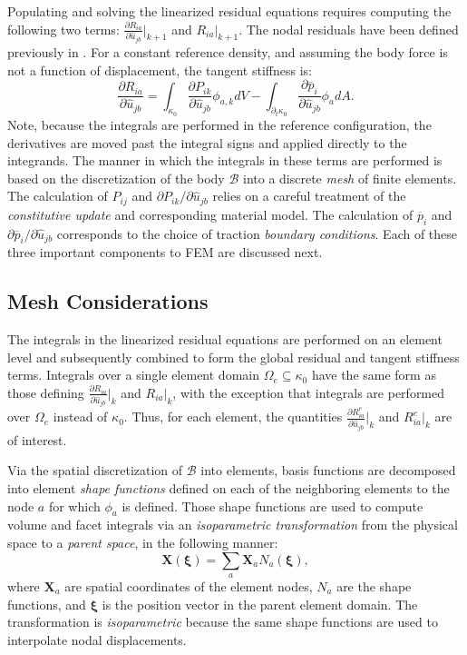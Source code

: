 Populating and solving the linearized residual equations requires computing the following two terms: $\frac{\partial R_{ia}}{\partial \hat{u}_{jb}} \big|_{k+1}$ and $R_{ia}\big|_{k+1}$. The nodal residuals have been defined previously in . For a constant reference density, and assuming the body force is not a function of displacement, the tangent stiffness is:
\begin{equation}
\frac{\partial R_{ia}}{\partial \hat{u}_{jb}} = \int_{\kappa_0}\frac{\partial P_{ik}}{\partial \hat{u}_{jb}}\phi_{a,k}dV - \int_{\partial_t\kappa_0}\frac{\partial \overline{p}_i}{\partial \hat{u}_{jb}}\phi_adA.
\end{equation}
Note, because the integrals are performed in the reference configuration, the derivatives are moved past the integral signs and applied directly to the integrands. The manner in which the integrals in these terms are performed is based on the discretization of the body $\mathcal{B}$ into a discrete \textit{mesh} of finite elements. The calculation of $P_{ij}$ and $\partial{P}_{ik}/\partial{\hat{u}_{jb}}$ relies on a careful treatment of the \textit{constitutive update} and corresponding material model. The calculation of $\overline{p}_i$ and $\partial{\overline{p}_i}/\partial{\hat{u}_{jb}}$ corresponds to the choice of traction \textit{boundary conditions}. Each of these three important components to FEM are discussed next.

\subsection{Mesh Considerations}

The integrals in the linearized residual equations are performed on an element level and subsequently combined to form the global residual and tangent stiffness terms. Integrals over a single element domain $\Omega_e \subseteq \kappa_0$ have the same form as those defining $\frac{\partial R_{ia}}{\partial \hat{u}_{jb}} \big|_k$ and $R_{ia}\big|_k$, with the exception that integrals are performed over $\Omega_e$ instead of $\kappa_0$. Thus, for each element, the quantities $\frac{\partial R^e_{ia}}{\partial \hat{u}_{jb}} \big|_k$ and $R^e_{ia}\big|_k$ are of interest.

Via the spatial discretization of $\mathcal{B}$ into elements, basis functions are decomposed into element \textit{shape functions} defined on each of the neighboring elements to the node $a$ for which $\phi_a$ is defined. Those shape functions are used to compute volume and facet integrals via an \textit{isoparametric transformation} from the physical space to a \textit{parent space}, in the following manner:
\begin{equation}
\bm{X}(\bm{\xi}) = \sum\limits_{a}\bm{X}_a{N}_a(\bm{\xi}),
\end{equation}
where $\bm{X}_a$ are spatial coordinates of the element nodes, $N_a$ are the shape functions, and $\bm{\xi}$ is the position vector in the parent element domain. The transformation is \textit{isoparametric} because the same shape functions are used to interpolate nodal displacements.


